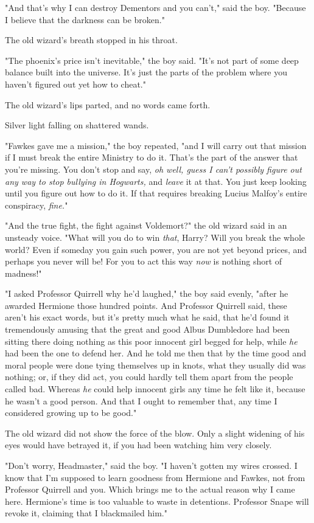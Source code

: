 "And that's why I can destroy Dementors and you can't," said the boy. "Because
I believe that the darkness can be broken."

The old wizard's breath stopped in his throat.

"The phoenix's price isn't inevitable," the boy said. "It's not part of some
deep balance built into the universe. It's just the parts of the problem where
you haven't figured out yet how to cheat."

The old wizard's lips parted, and no words came forth.

Silver light falling on shattered wands.

"Fawkes gave me a mission," the boy repeated, "and I will carry out that
mission if I must break the entire Ministry to do it. That's the part of the
answer that you're missing. You don't stop and say, \emph{oh well, guess I
can't possibly figure out any way to stop bullying in Hogwarts,} and
\emph{leave} it at that. You just keep looking until you figure out how to do
it. If that requires breaking Lucius Malfoy's entire conspiracy, \emph{fine.}"

"And the true fight, the fight against Voldemort?" the old wizard said in an
unsteady voice. "What will you do to win \emph{that}, Harry? Will you break the
whole world? Even if someday you gain such power, you are not yet beyond
prices, and perhaps you never will be! For you to act this way \emph{now} is
nothing short of madness!"

"I asked Professor Quirrell why he'd laughed," the boy said evenly, "after he
awarded Hermione those hundred points. And Professor Quirrell said, these
aren't his exact words, but it's pretty much what he said, that he'd found it
tremendously amusing that the great and good Albus Dumbledore had been sitting
there doing nothing as this poor innocent girl begged for help, while \emph{he}
had been the one to defend her. And he told me then that by the time good and
moral people were done tying themselves up in knots, what they usually did was
nothing; or, if they did act, you could hardly tell them apart from the people
called bad. Whereas \emph{he} could help innocent girls any time he felt like
it, because he wasn't a good person. And that I ought to remember that, any
time I considered growing up to be good."

The old wizard did not show the force of the blow. Only a slight widening of
his eyes would have betrayed it, if you had been watching him very closely.

"Don't worry, Headmaster," said the boy. "I haven't gotten my wires crossed. I
know that I'm supposed to learn goodness from Hermione and Fawkes, not from
Professor Quirrell and you. Which brings me to the actual reason why I came
here. Hermione's time is too valuable to waste in detentions. Professor Snape
will revoke it, claiming that I blackmailed him."

